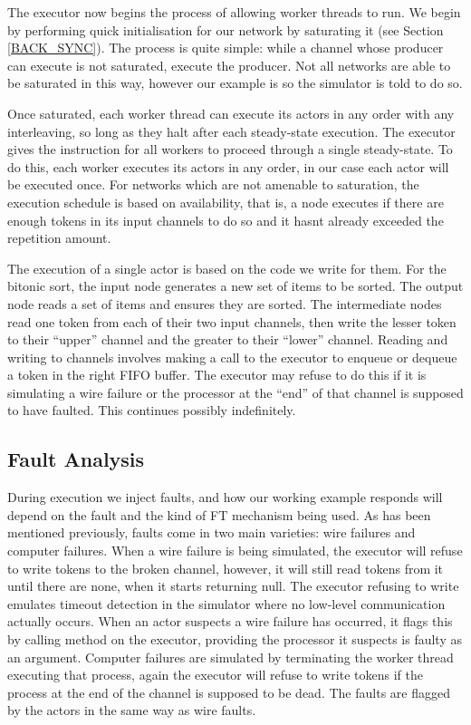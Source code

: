 The executor now begins the process of allowing worker threads to run.
We begin by performing quick initialisation for our network by saturating it (see Section \ref{BACK_SYNC}).
The process is quite simple: while a channel whose producer can execute is not saturated, execute the producer.
Not all networks are able to be saturated in this way, however our example is so the simulator is told to do so.

Once saturated, each worker thread can execute its actors in any order with any interleaving, so long as they halt after each steady-state execution.
The executor gives the instruction for all workers to proceed through a single steady-state.
To do this, each worker executes its actors in any order, in our case each actor will be executed once.
For networks which are not amenable to saturation, the execution schedule is based on availability, that is, a node executes if there are enough tokens in its input channels to do so and it hasnt already exceeded the repetition amount.

The execution of a single actor is based on the code we write for them.
For the bitonic sort, the input node generates a new set of items to be sorted.
The output node reads a set of items and ensures they are sorted.
The intermediate nodes read one token from each of their two input channels, then write the lesser token to their ``upper'' channel and the greater to their ``lower'' channel.
Reading and writing to channels involves making a call to the executor to enqueue or dequeue a token in the right FIFO buffer.
The executor may refuse to do this if it is simulating a wire failure or the processor at the ``end'' of that channel is supposed to have faulted.
This continues possibly indefinitely.

\subsection{Fault Analysis}

During execution we inject faults, and how our working example responds will depend on the fault and the kind of FT mechanism being used.
As has been mentioned previously, faults come in two main varieties: wire failures and computer failures.
When a wire failure is being simulated, the executor will refuse to write tokens to the broken channel, however, it will still read tokens from it until there are none, when it starts returning null.
The executor refusing to write emulates timeout detection in the simulator where no low-level communication actually occurs.
When an actor suspects a wire failure has occurred, it flags this by calling method on the executor, providing the processor it suspects is faulty as an argument.
Computer failures are simulated by terminating the worker thread executing that process, again the executor will refuse to write tokens if the process at the end of the channel is supposed to be dead.
The faults are flagged by the actors in the same way as wire faults.

